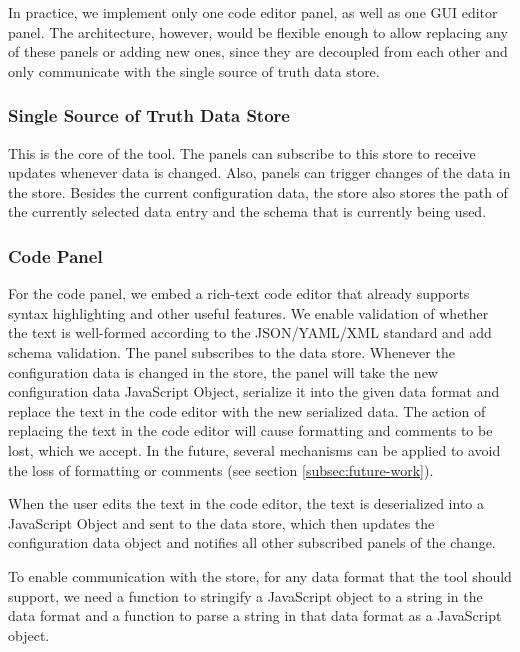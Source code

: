 In practice, we implement only one code editor panel, as well as one GUI editor panel.
The architecture, however, would be flexible enough to allow replacing any of these panels or adding new ones, since they are decoupled from each other and only communicate with the single source of truth data store.



\subsubsection{Single Source of Truth Data Store}
This is the core of the tool.
The panels can subscribe to this store to receive updates whenever data is changed.
Also, panels can trigger changes of the data in the store.
Besides the current configuration data, the store also stores the path of the currently selected data entry and the schema that is currently being used.


\subsubsection{Code Panel}\label{subsubsec:design_text_editor_panel}
For the code panel, we embed a rich-text code editor that already supports syntax highlighting and other useful features.
We enable validation of whether the text is well-formed according to the JSON/YAML/XML standard and add schema validation.
The panel subscribes to the data store.
Whenever the configuration data is changed in the store, the panel will take the new configuration data JavaScript Object, serialize it into the given data format and replace the text in the code editor with the new serialized data.
The action of replacing the text in the code editor will cause formatting and comments to be lost, which we accept.
In the future, several mechanisms can be applied to avoid the loss of formatting or comments (see section \ref{subsec:future-work}).

When the user edits the text in the code editor, the text is deserialized into a JavaScript Object and sent to the data store, which then updates the configuration data object and notifies all other subscribed panels of the change.


To enable communication with the store, for any data format that the tool should support, we need a function to stringify a JavaScript object to a string in the data format and a function to parse a string in that data format as a JavaScript object.



